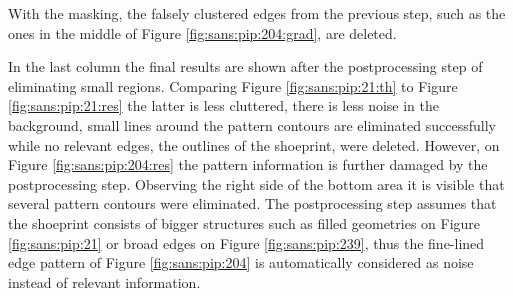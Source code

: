 \documentclass[draft,final]{vutinfth} %
\begin{document}
With the masking, the falsely clustered edges from the previous step, such as the ones in the middle of Figure \ref{fig:sans:pip:204:grad}, are deleted.
\par
In the last column the final results are shown after the postprocessing step of eliminating small regions.
Comparing Figure \ref{fig:sans:pip:21:th} to  Figure \ref{fig:sans:pip:21:res} the latter is less cluttered, there is less noise in the background, small lines around the pattern contours are eliminated successfully while no relevant edges, the outlines of the shoeprint, were deleted.
However, on Figure \ref{fig:sans:pip:204:res} the pattern information is further damaged by the postprocessing step.
Observing the right side of the bottom area it is visible that several pattern contours were eliminated.
The postprocessing step assumes that the shoeprint consists of bigger structures such as filled geometries on Figure \ref{fig:sans:pip:21} or broad edges on Figure \ref{fig:sans:pip:239}, thus the fine-lined edge pattern of Figure \ref{fig:sans:pip:204} is automatically considered as noise instead of relevant information.
\end{document}
